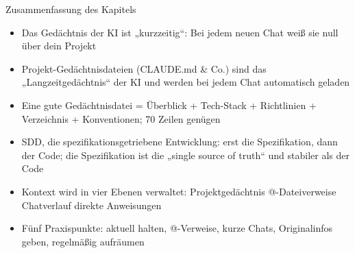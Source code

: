 \begin{tcbsummary}{Zusammenfassung des Kapitels}
\begin{itemize}
  \item Das Gedächtnis der KI ist „kurzzeitig“: Bei jedem neuen Chat weiß sie null über dein Projekt
  \item Projekt-Gedächtnisdateien (CLAUDE.md \& Co.) sind das „Langzeitgedächtnis“ der KI und werden bei jedem Chat automatisch geladen
  \item Eine gute Gedächtnisdatei = Überblick + Tech-Stack + Richtlinien + Verzeichnis + Konventionen; 70 Zeilen genügen
  \item SDD, die spezifikationsgetriebene Entwicklung: erst die Spezifikation, dann der Code; die Spezifikation ist die „single source of truth“ und stabiler als der Code
  \item Kontext wird in vier Ebenen verwaltet: Projektgedächtnis @-Dateiverweise Chatverlauf direkte Anweisungen
  \item Fünf Praxispunkte: aktuell halten, @-Verweise, kurze Chats, Originalinfos geben, regelmäßig aufräumen
\end{itemize}

\end{tcbsummary}
